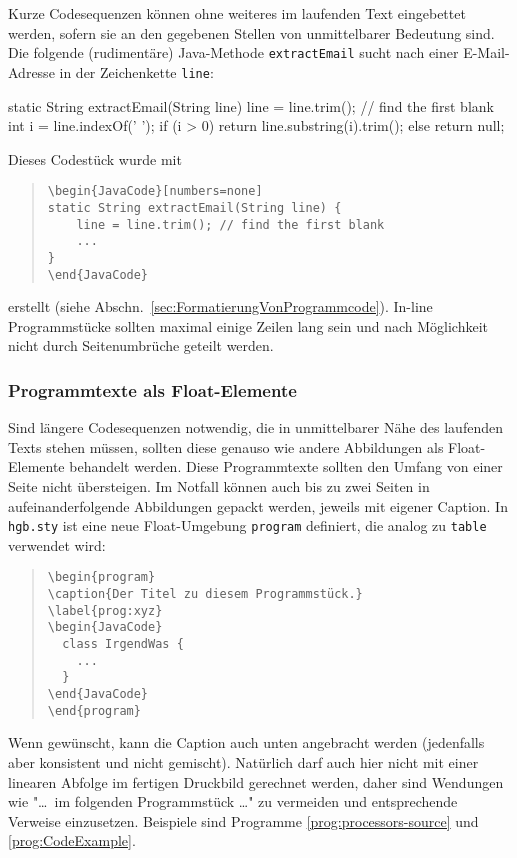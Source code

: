 Kurze Codesequenzen können ohne weiteres im laufenden Text
eingebettet werden, sofern sie an den gegebenen Stellen von unmittelbarer
Bedeutung sind. Die folgende (rudimentäre) Java-Methode \texttt{extractEmail} sucht
nach einer E-Mail-Adresse in der Zeichenkette
\texttt{line}:
%
\begin{JavaCode}[numbers=none]
static String extractEmail(String line) {
    line = line.trim(); // find the first blank
    int i = line.indexOf(' '); 
    if (i > 0)
        return line.substring(i).trim();
    else
        return null;
}
\end{JavaCode}
\medskip

\noindent
Dieses Codestück wurde mit 
%
\begin{quote}
\begin{verbatim}
\begin{JavaCode}[numbers=none]
static String extractEmail(String line) {
    line = line.trim(); // find the first blank
    ...
}
\end{JavaCode}
\end{verbatim}
\end{quote}
%
erstellt (siehe Abschn.\ \ref{sec:FormatierungVonProgrammcode}). 
In-line Programmstücke sollten maximal einige Zeilen lang sein und 
nach Möglichkeit nicht durch Seitenumbrüche geteilt werden.


\subsubsection{Programmtexte als Float-Elemente}
Sind längere Codesequenzen notwendig, die in unmittelbarer Nähe des laufenden Texts
stehen müssen, sollten diese genauso wie andere Abbildungen als Float-Elemente
behandelt werden. Diese Programmtexte sollten den Umfang von einer Seite nicht übersteigen.
Im Notfall können auch bis zu zwei Seiten in aufeinanderfolgende Abbildungen gepackt werden,
jeweils mit eigener Caption. In \texttt{hgb.sty} ist eine neue Float-Umgebung \texttt{program} definiert, die analog zu \texttt{table} verwendet wird:
%
\begin{quote}
\begin{verbatim}
\begin{program}
\caption{Der Titel zu diesem Programmstück.}
\label{prog:xyz}
\begin{JavaCode}
  class IrgendWas {
    ...
  }
\end{JavaCode}
\end{program}
\end{verbatim}
\end{quote}
%
Wenn gewünscht, kann die Caption auch unten angebracht werden 
(jedenfalls aber konsistent und nicht gemischt).
Natürlich darf auch hier nicht mit einer linearen Abfolge im fertigen
Druckbild gerechnet werden, daher sind Wendungen wie
"\ldots\ im  folgenden Programmstück \ldots" zu vermeiden und entsprechende Verweise
einzusetzen. Beispiele sind Programme \ref{prog:processors-source} und \ref{prog:CodeExample}.

